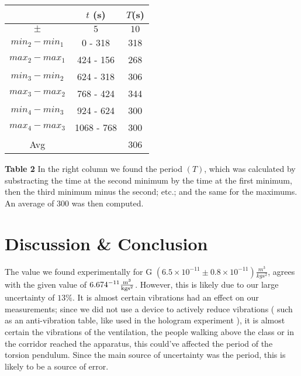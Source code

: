 \documentclass[12pt]{article}
\begin{document}
\begin{center}
    \begin{threeparttable}\label{tab:period}

        \begin{tabular}{|c|c|c|}
            \hline
     & $t$ (s) & $T$(s)\\ \hline 
            $\pm$ & $5$ & $10$ \\ \hline
            $min_2 - min_1$ &0 - 318 & 318 \\ \hline 
            $max_2 - max_1$ &424 - 156 & 268 \\ \hline
            $min_3 - min_2$ &624 - 318 & 306 \\ \hline
            $max_3 - max_2$ &768 - 424 & 344 \\ \hline
            $min_4 - min_3$ &924 - 624 & 300 \\ \hline
            $max_4 - max_3$ &1068 - 768 & 300 \\ \hline
            Avg& & 306 \\ \hline
        \end{tabular}
        \begin{tablenotes}
        \item \footnotesize \textbf{Table 2} In the right column we found the period $(T)$, which was calculated by substracting the time at the second minimum by the time at the first minimum, then the third minimum minus the second; etc.; and the same for the maximums. An average of 300 was then computed. 
        \end{tablenotes}
    \end{threeparttable}
\end{center}






\newpage
\section*{Discussion \& Conclusion}

The value we found experimentally for G $(6.5 \times 10^{-11}\pm 0.8 \times 10^{-11})\frac{\si{m^3}}{\si{kgs^2}}$, agrees with the given value of $6.674 \time 10^{-11}\frac{\si{m^3}}{\si{kgs^2}}$. However, this is likely due to our large uncertainty of $13\%$. It is almost certain vibrations had an effect on our measurements; since we did not use a device to actively reduce vibrations ( such as an anti-vibration table, like used in the hologram experiment ), it is almost certain the vibrations of the ventilation, the people walking above the class or in the corridor reached the apparatus, this could've affected the period of the torsion pendulum. Since the main source of uncertainty was the period, this is likely to be a source of error.
\end{document}

